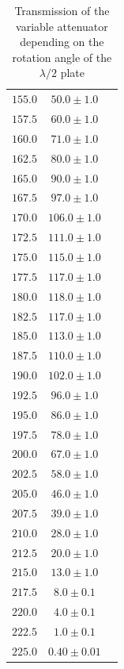 \documentclass{protokoll_en}
\begin{document}
\begin{appendix}
\begin{table}[H]
\begin{floatrow}
{\begin{tabular}{lcc}
$155.0$ & $50.0 \pm 1.0$ \\
$157.5$ & $60.0 \pm 1.0$ \\
$160.0$ & $71.0 \pm 1.0$ \\
$162.5$ & $80.0 \pm 1.0$ \\
$165.0$ & $90.0 \pm 1.0$ \\
$167.5$ & $97.0 \pm 1.0$ \\
$170.0$ & $106.0 \pm 1.0$ \\
$172.5$ & $111.0 \pm 1.0$ \\
$175.0$ & $115.0 \pm 1.0$ \\
$177.5$ & $117.0 \pm 1.0$ \\
$180.0$ & $118.0 \pm 1.0$ \\
$182.5$ & $117.0 \pm 1.0$ \\
$185.0$ & $113.0 \pm 1.0$ \\
$187.5$ & $110.0 \pm 1.0$ \\
$190.0$ & $102.0 \pm 1.0$ \\
$192.5$ & $96.0 \pm 1.0$ \\
$195.0$ & $86.0 \pm 1.0$ \\
$197.5$ & $78.0 \pm 1.0$ \\
$200.0$ & $67.0 \pm 1.0$ \\
$202.5$ & $58.0 \pm 1.0$ \\
$205.0$ & $46.0 \pm 1.0$ \\
$207.5$ & $39.0 \pm 1.0$ \\
$210.0$ & $28.0 \pm 1.0$ \\
$212.5$ & $20.0 \pm 1.0$ \\
$215.0$ & $13.0 \pm 1.0$ \\
$217.5$ & $8.0 \pm 0.1$ \\
$220.0$ & $4.0 \pm 0.1$ \\
$222.5$ & $1.0 \pm 0.1$ \\
$225.0$ & $0.40 \pm 0.01$ \\
    \bottomrule
  \end{tabular}
}
\end{floatrow}
\caption{Transmission of the variable attenuator depending on the rotation angle of the $\lambda / 2$ plate}
  \label{tab:ana_var_att}
\end{table}


\end{appendix}
\end{document}
